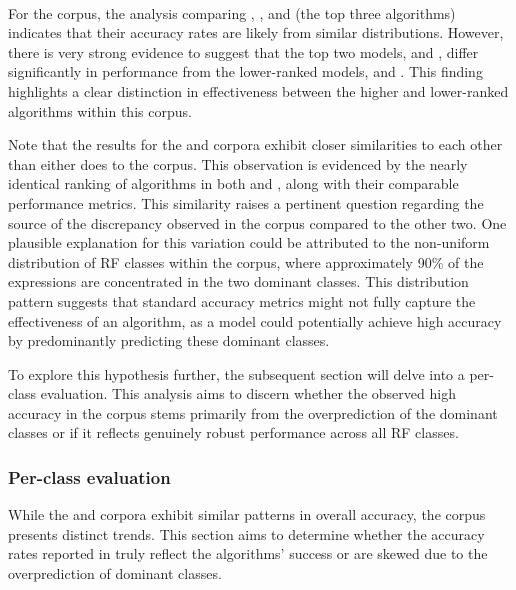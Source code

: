 \paragraph*{\wsj} 

For the \wsj corpus, the analysis comparing , , and  (the top three algorithms) indicates that their accuracy rates are likely from similar distributions. However, there is very strong evidence to suggest that the top two models,  and , differ significantly in performance from the lower-ranked models,  and . This finding highlights a clear distinction in effectiveness between the higher and lower-ranked algorithms within this corpus.

Note that the results for the \msrcor and \wsj corpora exhibit closer similarities to each other than either does to the \negcor corpus. This observation is evidenced by the nearly identical ranking of algorithms in both \msrcor and \wsj, along with their comparable performance metrics. This similarity raises a pertinent question regarding the source of the discrepancy observed in the \negcor corpus compared to the other two. One plausible explanation for this variation could be attributed to the non-uniform distribution of RF classes within the \negcor corpus, where approximately 90\% of the expressions are concentrated in the two dominant classes. This distribution pattern suggests that standard accuracy metrics might not fully capture the effectiveness of an algorithm, as a model could potentially achieve high accuracy by predominantly predicting these dominant classes.

To explore this hypothesis further, the subsequent section will delve into a per-class evaluation. This analysis aims to discern whether the observed high accuracy in the \negcor corpus stems primarily from the overprediction of the dominant classes or if it reflects genuinely robust performance across all RF classes.

\subsubsection{Per-class evaluation}\label{perclasseval}

While the \msrcor and \wsj corpora exhibit similar patterns in overall accuracy, the \negcor corpus presents distinct trends. This section aims to determine whether the accuracy rates reported in  truly reflect the algorithms' success or are skewed due to the overprediction of dominant classes. 

